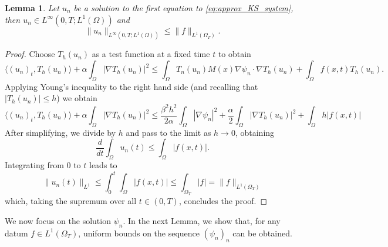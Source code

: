 \documentclass{amsart}
\numberwithin{equation}{section}
\newtheorem{lemma}[example]{Lemma}
\def\elle#1{L^{#1}}
\def\elleom#1{L^{#1}(\Omega)}
\def\elleomT#1{L^{#1}(\Omega_T)}
\def\io{\int_\Omega}
\def\ioT{\int_{\Omega_T}}
\def\norma#1#2{ \|#1 \|_{#2}}
\newcommand{\abs}[1]{\left|#1\right|}
\begin{document}
\begin{lemma}\label{StimaL1ParabEll}
Let $u_n$ be a solution to the first equation to \eqref{eq:approx_KS_system}, then $u_n\in\elle\infty(0,T;\elleom1)$ and
$$\norma{u_n}{\elle\infty(0,T;\elleom1)}\leq \norma{f}{\elle1(\Omega_T)}.$$
\end{lemma}
\begin{proof}
    Choose $T_h(u_n)$ as a test function at a fixed time $t$ to obtain
    $$
    \langle (u_n)_t,T_h(u_n)\rangle+\alpha\io\abs{\nabla T_h(u_n)}^2\leq 
    \io T_n(u_n) M(x)\nabla\psi_n\cdot\nabla T_h(u_n) +\io f(x,t)T_h(u_n).
    $$
    Applying Young's inequality to the right hand side (and recalling that $\abs{T_h(u_n)}\leq h$) we obtain
    $$
    \langle (u_n)_t,T_h(u_n)\rangle+\alpha\io\abs{\nabla T_h(u_n)}^2\leq 
    \frac{\beta^2 h^2}{2\alpha} \io\abs{\nabla\psi_n}^2+\frac{\alpha}{2}\io\abs{\nabla T_h(u_n)}^2 +\io h\abs{f(x,t)}
    $$
    After simplifying, we divide by $h$ and pass to the limit as $h\to0$, obtaining
    $$
    \frac{d}{dt}\io u_n(t)\leq \io \abs{f(x,t)}.
    $$
    Integrating from $0$ to $t$ leads to
    $$\norma{u_n(t)}{\elle1}\leq \int_0^t\io \abs{f(x,t)}\leq \ioT\abs{f}= \norma{f}{\elle1(\Omega_T)}$$
    which, taking the supremum over all $t\in(0,T)$, concludes the proof.
\end{proof}

We now focus on the solution $\psi_n$. In the next Lemma, we show that, for any datum $f\in\elleomT1$, uniform bounds on the sequence $(\psi_n)_n$ can be obtained.
    
\end{document}
